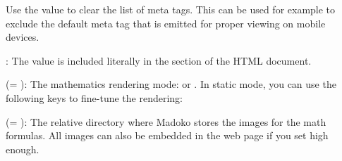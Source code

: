 \documentclass{book}
\begin{document}
\begin{mdUl}[class={list-star,loose},data-line={2239}]
\begin{mdLi}[data-line={2268}]
\begin{mdP}[data-line={2273}]%
{}  Use the value %
{}%
{} to clear the list of meta tags.
  This can be used for example to exclude the default %
{}%
{} meta tag that
  is emitted for proper viewing on mobile devices.%
\end{mdP}%
\end{mdLi}%
\begin{mdLi}[data-line={2277}]%
\begin{mdP}[data-line={2277}]%
{}%
{}: The value is included literally in the 
{}%
{} section of the HTML document.%
\end{mdP}%
\end{mdLi}%
\begin{mdLi}[id=item-math,data-line={2280}]%
\begin{mdP}[data-line={2280}]%
{}%
{} (=%
{}%
{}): The mathematics rendering mode: %
{}%
{} or %
{}%
{}.
In static mode, you can use the following keys to fine-tune the rendering:%
\end{mdP}%
\begin{mdUl}[class={list-star,loose},data-line={2282}]%
\begin{mdLi}[data-line={2282}]%
\begin{mdP}[data-line={2282}]%
{}%
{} %
{}%
{} (=%
{}%
{}): The relative directory where Madoko
  stores the images for the math formulas. All images can also be embedded
  in the web page if you set %
{}%
{} high enough.%
\end{mdP}%
\end{mdLi}%
\begin{mdLi}[data-line={2285}]%
\begin{mdP}[data-line={2285}]%

\end{mdP}
\end{mdLi}
\end{mdUl}
\end{mdLi}
\end{mdUl}
\end{document}
